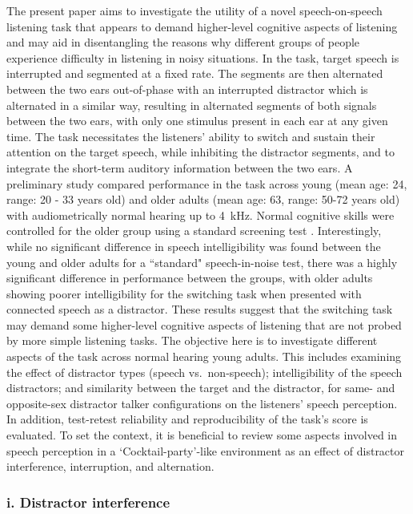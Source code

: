 \documentclass[a4paper, twoside]{templates/ociamthesis}
\begin{document}
The present paper aims to investigate the utility of a novel speech-on-speech listening task that appears to demand higher-level cognitive aspects of listening and may aid in disentangling the reasons why different groups of people experience difficulty in listening in noisy situations. In the task, target speech is interrupted and segmented at a fixed rate. The segments are then alternated between the two ears out-of-phase with an interrupted distractor which is alternated in a similar way, resulting in alternated segments of both signals between the two ears, with only one stimulus present in each ear at any given time. The task necessitates the listeners' ability to switch and sustain their attention on the target speech, while inhibiting the distractor segments, and to integrate the short-term auditory information between the two ears.
A preliminary study \autocite[unpublished BSc thesis][]{Akinseye2015} compared performance in the task across young (mean age: 24, range: 20 - 33 years old) and older adults (mean age: 63, range: 50-72 years old) with audiometrically normal hearing up to 4~kHz. Normal cognitive skills were controlled for the older group using a standard screening test \autocite[MoCA;][]{Nasreddine2005}. Interestingly, while no significant difference in speech intelligibility was found between the young and older adults for a ``standard" speech-in-noise test, there was a highly significant difference in performance between the groups, with older adults showing poorer intelligibility for the switching task when presented with connected speech as a distractor. These results suggest that the switching task may demand some higher-level cognitive aspects of listening that are not probed by more simple listening tasks.
The objective here is to investigate different aspects of the task across normal hearing young adults. This includes examining the effect of distractor types (speech vs.~non-speech); intelligibility of the speech distractors; and similarity between the target and the distractor, for same- and opposite-sex distractor talker configurations on the listeners' speech perception. In addition, test-retest reliability and reproducibility of the task's score is evaluated.
To set the context, it is beneficial to review some aspects involved in speech perception in a `Cocktail-party'-like environment \autocite{Cherry1953} as an effect of distractor interference, interruption, and alternation.\\

\hypertarget{i.-distractor-interference}{%
\subsubsection*{i. Distractor interference}\label{i.-distractor-interference}}
\end{document}
